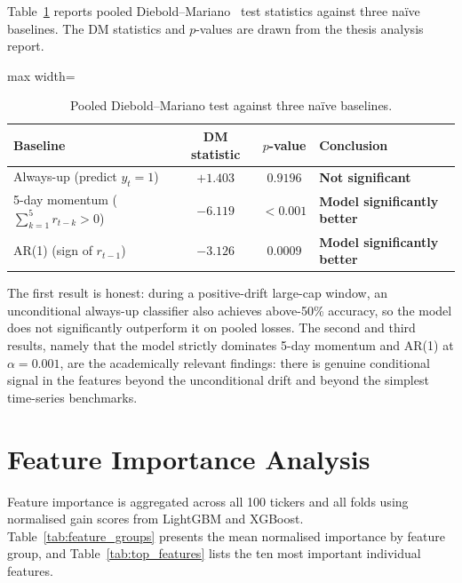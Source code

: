 Table~\ref{tab:dm_tests} reports pooled Diebold--Mariano~\cite{diebold1995dm} test statistics against three na\"{i}ve baselines. The DM statistics and $p$-values are drawn from the thesis analysis report.

\begin{table}[H]
\centering
\caption{Pooled Diebold--Mariano test against three na\"ive baselines.}
\label{tab:dm_tests}
\renewcommand{\arraystretch}{1.35}
\begin{adjustbox}{max width=\textwidth}
\begin{tabular}{l c c l}
\toprule
\textbf{Baseline} & \textbf{DM statistic} & \textbf{$p$-value} & \textbf{Conclusion} \\
\midrule
Always-up (predict $y_t=1$)      & $+1.403$ & $0.9196$ & \textbf{Not significant} \\
5-day momentum ($\sum_{k=1}^{5}r_{t-k}>0$) & $-6.119$ & $<0.001$ & \textbf{Model significantly better} \\
AR(1) (sign of $r_{t-1}$)        & $-3.126$ & $0.0009$ & \textbf{Model significantly better} \\
\bottomrule
\end{tabular}
\end{adjustbox}
\end{table}

The first result is honest: during a positive-drift large-cap window, an unconditional always-up classifier also achieves above-50\% accuracy, so the model does not significantly outperform it on pooled losses. The second and third results, namely that the model strictly dominates 5-day momentum and AR(1) at $\alpha=0.001$, are the academically relevant findings: there is genuine conditional signal in the features beyond the unconditional drift and beyond the simplest time-series benchmarks.

\section{Feature Importance Analysis}

Feature importance is aggregated across all 100 tickers and all folds using normalised gain scores from LightGBM and XGBoost. Table~\ref{tab:feature_groups} presents the mean normalised importance by feature group, and Table~\ref{tab:top_features} lists the ten most important individual features.

